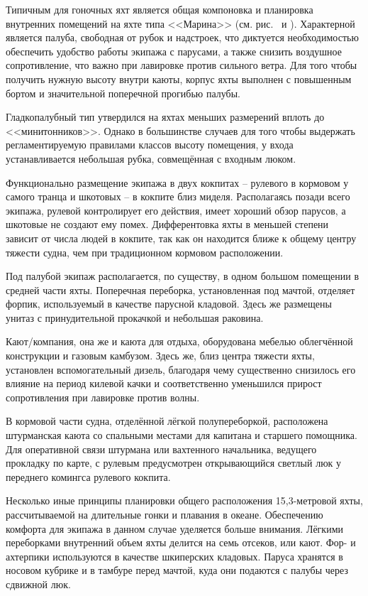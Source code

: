 Типичным для гоночных яхт является общая компоновка и планировка
внутренних помещений на яхте типа <<Марина>> (см. рис.~ и
). Характерной является палуба, свободная от рубок и
надстроек, что диктуется необходимостью обеспечить удобство работы
экипажа с парусами, а также снизить воздушное сопротивление, что важно
при лавировке против сильного ветра. Для того чтобы получить нужную
высоту внутри каюты, корпус яхты выполнен с повышенным бортом и
значительной поперечной прогибью палубы.

Гладкопалубный тип утвердился на яхтах меньших размерений вплоть до
<<минитонников>>. Однако в большинстве случаев для того чтобы
выдержать регламентируемую правилами классов высоту помещения, у входа
устанавливается небольшая рубка, совмещённая с входным люком.

Функционально размещение экипажа в двух кокпитах \--- рулевого в
кормовом у самого транца и шкотовых \--- в кокпите близ
миделя. Располагаясь позади всего экипажа, рулевой контролирует его
действия, имеет хороший обзор парусов, а шкотовые не создают ему
помех. Дифферентовка яхты в меньшей степени зависит от числа людей в
кокпите, так как он находится ближе к общему центру тяжести судна, чем
при традиционном кормовом расположении.

Под палубой экипаж располагается, по существу, в одном большом
помещении в средней части яхты. Поперечная переборка, установленная
под мачтой, отделяет форпик, используемый в качестве парусной
кладовой. Здесь же размещены унитаз с принудительной прокачкой и
небольшая раковина.

Кают\-/компания, она же и каюта для отдыха, оборудована мебелью
облегчённой конструкции и газовым камбузом. Здесь же, близ центра
тяжести яхты, установлен вспомогательный дизель, благодаря чему
существенно снизилось его влияние на период килевой качки и
соответственно уменьшился прирост сопротивления при лавировке против
волны.

В кормовой части судна, отделённой лёгкой полупереборкой, расположена
штурманская каюта со спальными местами для капитана и старшего
помощника. Для оперативной связи штурмана или вахтенного начальника,
ведущего прокладку по карте, с рулевым предусмотрен открывающийся
светлый люк у переднего комингса рулевого кокпита.

Несколько иные принципы планировки общего расположения 15,3\--метровой
яхты, рассчитываемой на длительные гонки и плавания в
океане. Обеспечению комфорта для экипажа в данном случае уделяется
больше внимания. Лёгкими переборками внутренний объем яхты делится на
семь отсеков, или кают. Фор\-- и ахтерпики используются в качестве
шкиперских кладовых. Паруса хранятся в носовом кубрике и в тамбуре
перед мачтой, куда они подаются с палубы через сдвижной люк.

